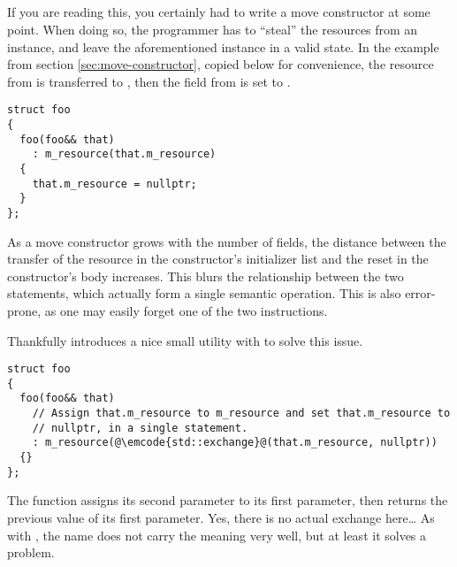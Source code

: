 \subsection{}%
%
\problemtitle%
%
%
%
If you are reading this, you certainly had to write a move constructor
at some point. When doing so, the programmer has to ``steal'' the
resources from an instance, and leave the aforementioned instance in a
valid state. In the example from section \ref{sec:move-constructor},
copied below for convenience, the resource from  is
transferred to , then the field from  is set to
.

\begin{lstlisting}
struct foo
{
  foo(foo&& that)
    : m_resource(that.m_resource)
  {
    that.m_resource = nullptr;
  }
};
\end{lstlisting}

As a move constructor grows with the number of fields, the distance
between the transfer of the resource in the constructor's initializer
list and the reset in the constructor's body increases. This blurs the
relationship between the two statements, which actually form a single
semantic operation. This is also error-prone, as one may easily forget
one of the two instructions.

\solutiontitle

Thankfully  introduces a nice small utility with
 to solve this issue.

\begin{lstlisting}
struct foo
{
  foo(foo&& that)
    // Assign that.m_resource to m_resource and set that.m_resource to
    // nullptr, in a single statement.
    : m_resource(@\emcode{std::exchange}@(that.m_resource, nullptr))
  {}
};
\end{lstlisting}

The  function assigns its second parameter to its
first parameter, then returns the previous value of its first
parameter. Yes, there is no actual exchange here… As with
, the name does not carry the meaning very well, but
at least it solves a problem.
